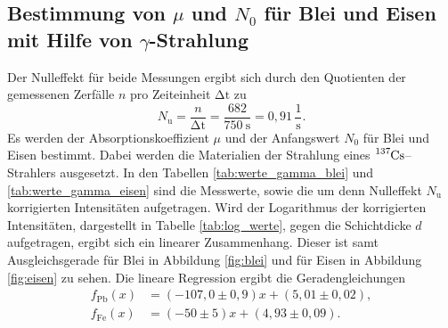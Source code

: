 \subsection{Bestimmung von \texorpdfstring{$\mu$}{Absorptionskoeffizient} und \texorpdfstring{$N_0$}{Anfangswert} für Blei und Eisen mit Hilfe von \texorpdfstring{$\gamma$}{Gamma}-Strahlung}
Der Nulleffekt für beide Messungen ergibt sich durch den Quotienten der gemessenen Zerfälle $n$ pro Zeiteinheit ${\mathup{\Delta{t}}}$ zu
\begin{equation}
N_\mathup{u}=\frac{n}{\mathup{\Delta{t}}}=\frac{682}{\SI{750}{\second}}=0,91\,\frac{1}{\si\second}.
\label{eq:N_u}
\end{equation}
Es werden der Absorptionskoeffizient $\mu$ und der Anfangswert $N_0$ für Blei und Eisen bestimmt. Dabei werden die Materialien der Strahlung eines $\ce{^{137}Cs}$--Strahlers ausgesetzt. 
In den Tabellen \ref{tab:werte_gamma_blei} und \ref{tab:werte_gamma_eisen} sind die Messwerte, sowie die um denn Nulleffekt $N_\mathup{u}$ korrigierten Intensitäten aufgetragen. 
Wird der Logarithmus der korrigierten Intensitäten, dargestellt in Tabelle \ref{tab:log_werte}, gegen die Schichtdicke $d$ aufgetragen, ergibt sich ein linearer Zusammenhang. 
Dieser ist samt Ausgleichsgerade für Blei in Abbildung \ref{fig:blei} und für Eisen in Abbildung \ref{fig:eisen} zu sehen.
Die lineare Regression ergibt die Geradengleichungen 
\begin{align}
f_\mathup{Pb}(x)&=(-107,0\pm0,9)x+(5,01\pm0,02),\\
f_\mathup{Fe}(x)&=(-50\pm5)x+(4,93\pm0,09).
\label{eq:lin_regress}
\end{align}
